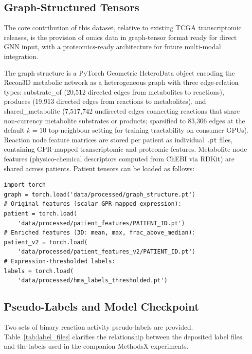 \documentclass[12pt,a4paper]{article}
\begin{document}
\subsection{Graph-Structured Tensors}

The core contribution of this dataset, relative to existing TCGA transcriptomic releases, is the provision of omics data in graph-tensor format ready for direct GNN input, with a proteomics-ready architecture for future multi-modal integration.

The graph structure is a PyTorch Geometric HeteroData object encoding the Recon3D metabolic network as a heterogeneous graph with three edge-relation types: substrate\_of (20,512 directed edges from metabolites to reactions), produces (19,913 directed edges from reactions to metabolites), and shared\_metabolite (7,517,742 undirected edges connecting reactions that share non-currency metabolite substrates or products; sparsified to 83,306 edges at the default $k = 10$ top-neighbour setting for training tractability on consumer GPUs). Reaction node feature matrices are stored per patient as individual \texttt{.pt} files, containing GPR-mapped transcriptomic and proteomic features. Metabolite node features (physico-chemical descriptors computed from ChEBI via RDKit) are shared across patients. Patient tensors can be loaded as follows:

{\small
\begin{verbatim}
import torch
graph = torch.load('data/processed/graph_structure.pt')
# Original features (scalar GPR-mapped expression):
patient = torch.load(
    'data/processed/patient_features/PATIENT_ID.pt')
# Enriched features (3D: mean, max, frac_above_median):
patient_v2 = torch.load(
    'data/processed/patient_features_v2/PATIENT_ID.pt')
# Expression-thresholded labels:
labels = torch.load(
    'data/processed/hma_labels_thresholded.pt')
\end{verbatim}
}

\subsection{Pseudo-Labels and Model Checkpoint}

Two sets of binary reaction activity pseudo-labels are provided. Table~\ref{tab:label_files} clarifies the relationship between the deposited label files and the labels used in the companion MethodsX experiments.
\end{document}
